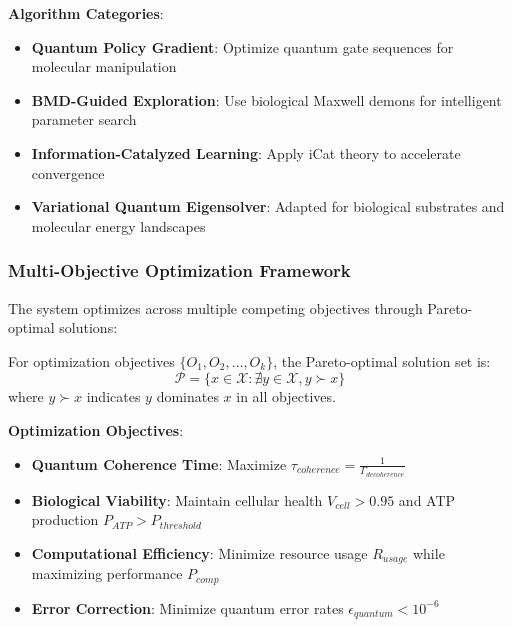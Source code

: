 ﻿\documentclass[11pt,a4paper]{article}
\begin{document}
\textbf{Algorithm Categories}:
\begin{itemize}
\item \textbf{Quantum Policy Gradient}: Optimize quantum gate sequences for molecular manipulation
\item \textbf{BMD-Guided Exploration}: Use biological Maxwell demons for intelligent parameter search
\item \textbf{Information-Catalyzed Learning}: Apply iCat theory to accelerate convergence
\item \textbf{Variational Quantum Eigensolver}: Adapted for biological substrates and molecular energy landscapes
\end{itemize}

\subsubsection{Multi-Objective Optimization Framework}

The system optimizes across multiple competing objectives through Pareto-optimal solutions:

\begin{definition}
For optimization objectives $\{O_1, O_2, \ldots, O_k\}$, the Pareto-optimal solution set is:
\begin{equation}
\mathcal{P} = \{x \in \mathcal{X} : \nexists y \in \mathcal{X}, y \succ x\}
\end{equation}
where $y \succ x$ indicates $y$ dominates $x$ in all objectives.
\end{definition}

\textbf{Optimization Objectives}:
\begin{itemize}
\item \textbf{Quantum Coherence Time}: Maximize $\tau_{coherence} = \frac{1}{\Gamma_{decoherence}}$
\item \textbf{Biological Viability}: Maintain cellular health $V_{cell} > 0.95$ and ATP production $P_{ATP} > P_{threshold}$
\item \textbf{Computational Efficiency}: Minimize resource usage $R_{usage}$ while maximizing performance $P_{comp}$
\item \textbf{Error Correction}: Minimize quantum error rates $\epsilon_{quantum} < 10^{-6}$
\end{itemize}
\end{document}
